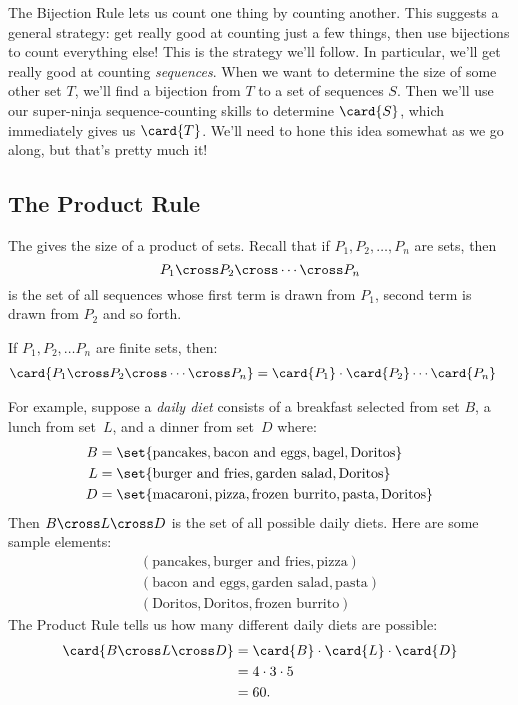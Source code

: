 The Bijection Rule lets us count one thing by counting another.  This
suggests a general strategy: get really good at counting just a few
things, then use bijections to count everything else!  This is the
strategy we'll follow.  In particular, we'll get really good at
counting \emph{sequences}.  When we want to determine the size of some
other set $T$, we'll find a bijection from $T$ to a set of sequences
$S$.  Then we'll use our super-ninja sequence-counting skills to
determine $\card{S}$, which immediately gives us $\card{T}$.  We'll
need to hone this idea somewhat as we go along, but that's pretty much
it!

\subsection{The Product Rule}

The  gives the size of a product of sets.  Recall
that if $P_1, P_2, \ldots, P_n$ are sets, then
%
\[
P_1 \cross P_2 \cross \cdots \cross P_n
\]
%
is the set of all sequences whose first term is drawn from $P_1$,
second term is drawn from $P_2$ and so forth.

\begin{rul}
If $P_1, P_2, \ldots P_n$ are finite sets, then:
%
\begin{align*}
\card{P_1 \cross P_2 \cross \cdots \cross P_n}
    & = \card{P_1} \cdot \card{P_2} \cdots \card{P_n}
\end{align*}
\end{rul}

For example, suppose a \emph{daily diet}
consists of a breakfast selected from set $B$, a lunch from set~$L$,
and a dinner from set~$D$ where:
%
\begin{align*}
B & = \set{\text{pancakes},
      	   \text{bacon and eggs},
           \text{bagel},
           \text{Doritos}} \\
L & = \set{\text{burger and fries},
           \text{garden salad},
           \text{Doritos}} \\
D & = \set{\text{macaroni},
           \text{pizza},
           \text{frozen burrito},
           \text{pasta},
           \text{Doritos}}
\end{align*}
%
Then $B \cross L \cross D$ is the set of all possible daily diets.
Here are some sample elements:
%
\begin{gather*}
(\text{pancakes}, \text{burger and fries}, \text{pizza}) \\
(\text{bacon and eggs}, \text{garden salad}, \text{pasta}) \\
(\text{Doritos}, \text{Doritos}, \text{frozen burrito})
\end{gather*}
%
The Product Rule tells us how many different daily diets are possible:
%
\begin{align*}
\card{B \cross L \cross D}
    & = \card{B} \cdot \card{L} \cdot \card{D} \\
    & = 4 \cdot 3 \cdot 5 \\
    & = 60.
\end{align*}


